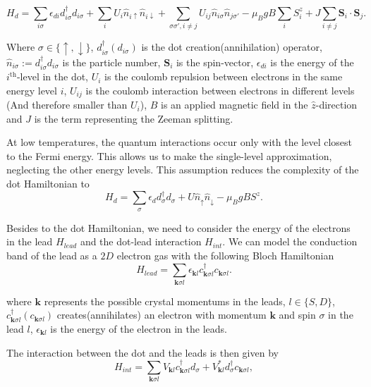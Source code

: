 \[
H_{d}=\sum_{i\sigma}\epsilon_{di}d_{i\sigma}^{\dagger}d_{i\sigma}+\sum_{i}U_{i}\hat{n}_{i\uparrow}\hat{n}_{i\downarrow}+\sum_{\sigma\sigma',i\neq j}U_{ij}\hat{n}_{i\sigma}\hat{n}_{j\sigma'}-\mu_{B}gB\sum_{i}S_{i}^{z}+J\sum_{i\neq j}\mathbf{S}_{i}\cdot\mathbf{S}_{j}.
\]


Where $\sigma\in\{\uparrow,\downarrow\}$, $d_{i\sigma}^{\dagger}\left(d_{i\sigma}\right)$
is the dot creation(annihilation) operator,$\hat{n}_{i\sigma}:=d_{i\sigma}^{\dagger}d_{i\sigma}$
is the particle number, $\mathbf{S}_{i}$ is the spin-vector, $\epsilon_{di}$
is the energy of the $i^{\mbox{th}}$-level in the dot, $U_{i}$ is
the coulomb repulsion between electrons in the same energy level $i$,
$U_{ij}$ is the coulomb interaction between electrons in different
levels (And therefore smaller than $U_{i}$), \textbf{$B$} is an
applied magnetic field in the $\hat{z}$-direction and $J$ is the
term representing the Zeeman splitting. 

At low temperatures, the quantum interactions occur only with the level closest to the Fermi energy. This allows us to make the single-level approximation, neglecting the other energy levels. This assumption reduces the complexity of the dot Hamiltonian to \\


\begin{equation}
    H_{d}=\sum_{\sigma}\epsilon_{d}d_{\sigma}^{\dagger}d_{\sigma}+U\hat{n}_{\uparrow}\hat{n}_{\downarrow}-\mu_{B}gBS^{z}. \label{eq:hdot}
\end{equation}

Besides to the dot Hamiltonian, we need to consider the energy of the electrons in the lead $H_{lead}$ and the dot-lead interaction $H_{int}$. We can model  the conduction band of the lead as a $2D$ electron gas with the following Bloch Hamiltonian
\begin{equation}
H_{lead}  =  \sum_{\mathbf{k}\sigma l}\epsilon_{\mathbf{k}l}c_{\mathbf{k}\sigma l}^{\dagger}c_{\mathbf{k}\sigma l}. 
\end{equation}

where $\mathbf{k}$ represents the possible crystal momentums in the
leads, $l\in\{S,D\}$, $c_{\mathbf{k}\sigma l}^{\dagger}(c_{\mathbf{k}\sigma l})$
creates(annihilates) an electron with momentum $\mathbf{k}$ and spin
$\sigma$ in the lead $l$, $\epsilon_{\mathbf{k}l}$ is the energy
of the electron in the leads. 

The interaction between the dot and the leads is then given by 
\begin{equation}
H_{int} = \sum_{\mathbf{k}\sigma l}V_{\mathbf{k}l}c_{\mathbf{k}\sigma l}^{\dagger}d_{\sigma}+V_{\mathbf{k}l}^{*}d_{\sigma}^{\dagger}c_{\mathbf{k}\sigma l},
\end{equation}

